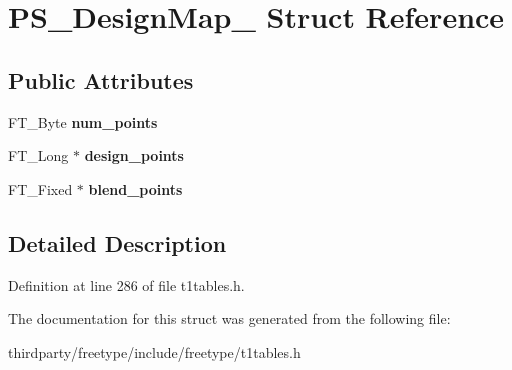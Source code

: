\hypertarget{struct_p_s___design_map__}{}\section{P\+S\+\_\+\+Design\+Map\+\_\+ Struct Reference}
\label{struct_p_s___design_map__}
\subsection*{Public Attributes}
\begin{DoxyCompactItemize}
\item 
\mbox{\label{struct_p_s___design_map___a505a70dd0f497f177fffca9bc4e5d0a5}} 
F\+T\+\_\+\+Byte {\bfseries num\+\_\+points}
\item 
\mbox{\label{struct_p_s___design_map___abd7a86ba33248ceed657c31063b49679}} 
F\+T\+\_\+\+Long $\ast$ {\bfseries design\+\_\+points}
\item 
\mbox{\label{struct_p_s___design_map___a74a555fb4315fca7477f6d20d49686ec}} 
F\+T\+\_\+\+Fixed $\ast$ {\bfseries blend\+\_\+points}
\end{DoxyCompactItemize}


\subsection{Detailed Description}


Definition at line 286 of file t1tables.\+h.



The documentation for this struct was generated from the following file\+:\begin{DoxyCompactItemize}
\item 
thirdparty/freetype/include/freetype/t1tables.\+h\end{DoxyCompactItemize}
